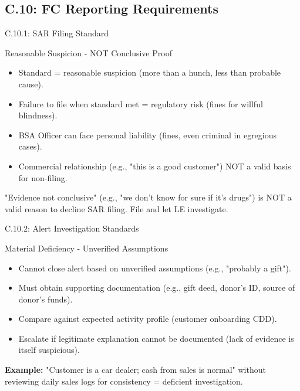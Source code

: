 \documentclass{beamer}
\begin{document}
	\subsection{C.10: FC Reporting Requirements}
	
	\begin{frame}{C.10.1: SAR Filing Standard}
		\begin{block}{Reasonable Suspicion - NOT Conclusive Proof}
			\begin{itemize}
				\item Standard = reasonable suspicion (more than a hunch, less than probable cause).
				\item Failure to file when standard met = regulatory risk (fines for willful blindness).
				\item BSA Officer can face personal liability (fines, even criminal in egregious cases).
				\item Commercial relationship (e.g., "this is a good customer") NOT a valid basis for non-filing.
			\end{itemize}
		\end{block}
		\textcolor{red}{\textbf{}} "Evidence not conclusive" (e.g., "we don't know for sure if it's drugs") is NOT a valid reason to decline SAR filing. File and let LE investigate.
	\end{frame}
	
	\begin{frame}{C.10.2: Alert Investigation Standards}
		\begin{block}{Material Deficiency - Unverified Assumptions}
			\begin{itemize}
				\item Cannot close alert based on unverified assumptions (e.g., "probably a gift").
				\item Must obtain supporting documentation (e.g., gift deed, donor's ID, source of donor's funds).
				\item Compare against expected activity profile (customer onboarding CDD).
				\item Escalate if legitimate explanation cannot be documented (lack of evidence is itself suspicious).
			\end{itemize}
		\end{block}
		\textbf{Example:} "Customer is a car dealer; cash from sales is normal" without reviewing daily sales logs for consistency = deficient investigation.
	\end{frame}
	
\end{document}

